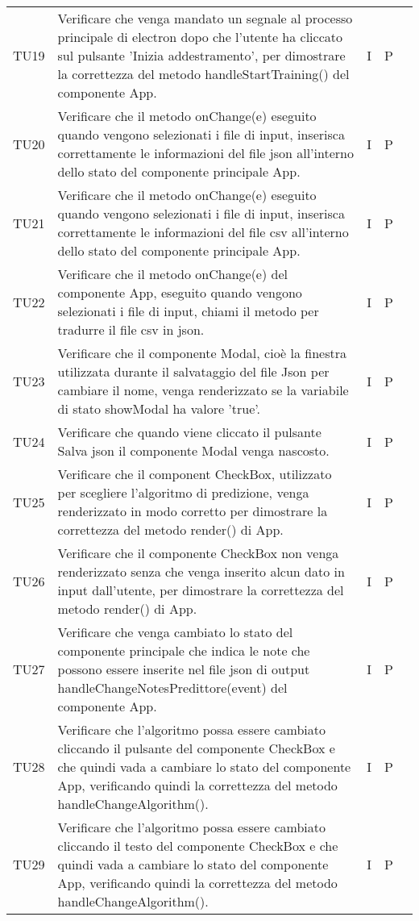 \begin{longtable} {
		>{}p{15mm} 
		>{}p{79.5mm}
		>{}p{15mm} 
		>{}p{15mm}
		>{}p{0mm}}
	TU19	& Verificare che venga mandato un segnale al processo principale di electron dopo che l'utente ha cliccato sul pulsante 'Inizia addestramento', per dimostrare la correttezza del metodo handleStartTraining() del componente App. & I & P &\TBstrut \\ [2mm]
	TU20	& Verificare che il metodo onChange(e) eseguito quando vengono selezionati i file di input, inserisca correttamente le informazioni del file json all'interno dello stato del componente principale App. & I & P &\TBstrut \\ [2mm]
	TU21	& Verificare che il metodo onChange(e) eseguito quando vengono selezionati i file di input, inserisca correttamente le informazioni del file csv all'interno dello stato del componente principale App. & I & P &\TBstrut \\ [2mm]
	TU22	& Verificare che il metodo onChange(e) del componente App, eseguito quando vengono selezionati i file di input, chiami il metodo per tradurre il file csv in json. & I & P &\TBstrut \\ [2mm]
	TU23	& Verificare che il componente Modal, cioè la finestra utilizzata durante il salvataggio del file Json per cambiare il nome, venga renderizzato se la variabile di stato showModal ha valore 'true'. & I & P &\TBstrut \\ [2mm]
	TU24	& Verificare che quando viene cliccato il pulsante Salva json il componente Modal venga nascosto. & I & P &\TBstrut \\ [2mm]
	TU25	& Verificare che il component CheckBox, utilizzato per scegliere l'algoritmo di predizione, venga renderizzato in modo corretto per dimostrare la correttezza del metodo render() di App. & I & P &\TBstrut \\ [2mm]
	TU26	& Verificare che il componente CheckBox non venga renderizzato senza che venga inserito alcun dato in input dall'utente, per dimostrare la correttezza del metodo render() di App. & I & P &\TBstrut \\ [2mm]
	TU27	& Verificare che venga cambiato lo stato del componente principale che indica le note che possono essere inserite nel file json di output handleChangeNotesPredittore(event) del componente App. & I & P &\TBstrut \\ [2mm]
	TU28	& Verificare che l'algoritmo possa essere cambiato cliccando il pulsante del componente CheckBox e che quindi vada a cambiare lo stato del componente App, verificando quindi la correttezza del metodo handleChangeAlgorithm(). & I & P &\TBstrut \\ [2mm]
	TU29	& Verificare che l'algoritmo possa essere cambiato cliccando il testo del componente CheckBox e che quindi vada a cambiare lo stato del componente App, verificando quindi la correttezza del metodo handleChangeAlgorithm(). & I & P &\TBstrut \\ [2mm]

\end{longtable}
